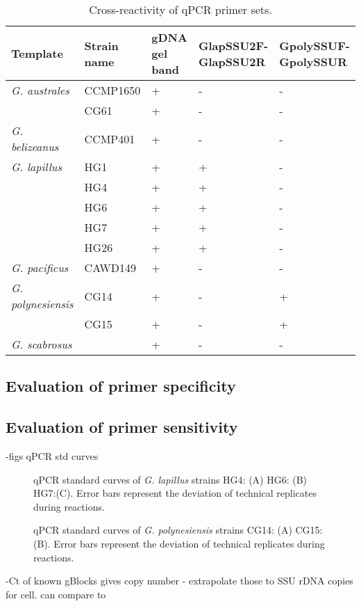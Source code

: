 \documentclass[12pt]{article}
\begin{document}
\FloatBarrier
\begin{table}
\caption{Cross-reactivity of qPCR primer sets.}
\label{tbl:CrossreactTable}
\begin{tabular}{  | p{4cm} | p{3cm} | p{2cm} | p{2.5cm} | p{2.5cm} | }
\hline
\textbf{Template} & \textbf{Strain name} & \textbf{gDNA gel band} & \textbf{GlapSSU2F-GlapSSU2R} & \textbf{GpolySSUF-GpolySSUR}  \\
  \hline
\emph{G. australes} & CCMP1650 &+&-&- \\
  \hline
 & CG61 &+&-&- \\
   \hline
 \emph{G. belizeanus}&CCMP401&+&-&-\\
   \hline
 \emph{G. lapillus}&HG1&+&+&-\\
   \hline
 &HG4&+&+&-\\
   \hline
 &HG6&+&+&-\\
   \hline
   &HG7&+&+&-\\
   \hline
   &HG26&+&+&-\\
  \hline
   \emph{G. pacificus}&CAWD149&+&-&-\\
  \hline
   \emph{G. polynesiensis}&CG14&+&-&+\\
   \hline
   &CG15&+&-&+\\
  \hline
  \emph{G. scabrosus}&&+&-&-\\
    \hline
 \end{tabular}
\end{table}

\subsection{Evaluation of primer specificity}

\subsection{Evaluation of primer sensitivity}
-figs qPCR std curves
\FloatBarrier 
\begin{figure} 
\caption{qPCR standard curves of \emph{G. lapillus} strains HG4: (A) HG6: (B) HG7:(C). Error bars represent the deviation of technical replicates during reactions.} 
\label{fig:lapiStd}
\end{figure} 
\FloatBarrier

\FloatBarrier 
\begin{figure} 
\caption{qPCR standard curves of \emph{G. polynesiensis} strains CG14: (A) CG15: (B). Error bars represent the deviation of technical replicates during reactions.} 
\label{fig:polyStd}
\end{figure} 
\FloatBarrier
-Ct of known gBlocks gives copy number - extrapolate those to SSU rDNA copies for cell. can compare to
\end{document}
